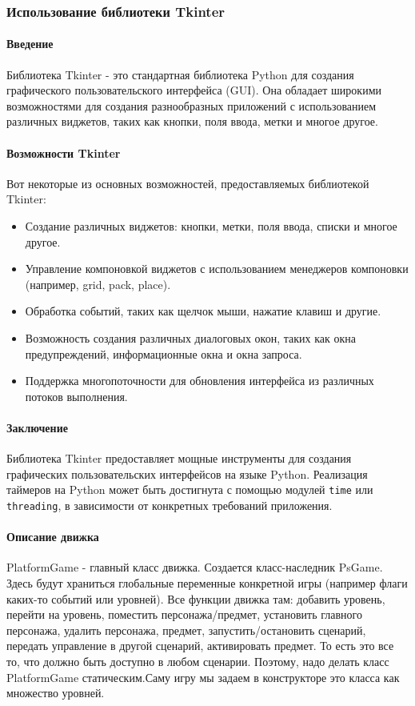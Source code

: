 \subsubsection{Использование библиотеки Tkinter}

\paragraph{Введение}
Библиотека Tkinter - это стандартная библиотека Python для создания графического пользовательского интерфейса (GUI). Она обладает широкими возможностями для создания разнообразных приложений с использованием различных виджетов, таких как кнопки, поля ввода, метки и многое другое.

\paragraph{Возможности Tkinter}
Вот некоторые из основных возможностей, предоставляемых библиотекой Tkinter:

\begin{itemize}
	\item Создание различных виджетов: кнопки, метки, поля ввода, списки и многое другое.
	\item Управление компоновкой виджетов с использованием менеджеров компоновки (например, grid, pack, place).
	\item Обработка событий, таких как щелчок мыши, нажатие клавиш и другие.
	\item Возможность создания различных диалоговых окон, таких как окна предупреждений, информационные окна и окна запроса.
	\item Поддержка многопоточности для обновления интерфейса из различных потоков выполнения.
\end{itemize}

\paragraph{Заключение}
Библиотека Tkinter предоставляет мощные инструменты для создания графических пользовательских интерфейсов на языке Python. Реализация таймеров на Python может быть достигнута с помощью модулей \texttt{time} или \texttt{threading}, в зависимости от конкретных требований приложения.

\paragraph{Описание движка}
PlatformGame - главный класс движка. Создается класс-наследник PsGame. Здесь будут храниться глобальные переменные конкретной игры (например флаги каких-то событий или уровней). Все функции движка там: добавить уровень, перейти на уровень, поместить персонажа/предмет, установить главного персонажа, удалить персонажа, предмет, запустить/остановить сценарий, передать управление в другой сценарий, активировать предмет.
То есть это все то, что должно быть доступно в любом сценарии. Поэтому, надо делать класс PlatformGame статическим.Саму игру мы задаем в конструкторе это класса как множество уровней. 

